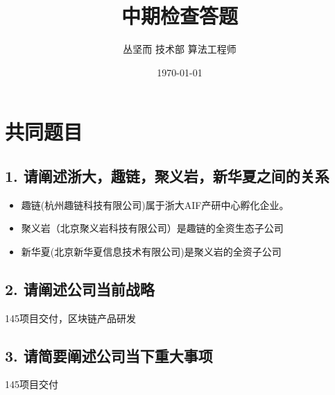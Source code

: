\documentclass[dvipsnames]{ctexart}
\title{中期检查答题}
\date{\today}
\author{丛坚而 技术部 算法工程师}
\begin{document}
\maketitle{}

\section*{共同题目}

\subsection*{1. 请阐述浙大，趣链，聚义岩，新华夏之间的关系}

\begin{itemize}
\item 趣链(杭州趣链科技有限公司)属于浙大AIF产研中心孵化企业。
\item 聚义岩（北京聚义岩科技有限公司）是趣链的全资生态子公司
\item 新华夏(北京新华夏信息技术有限公司)是聚义岩的全资子公司
\end{itemize}

\subsection*{2. 请阐述公司当前战略}
145项目交付，区块链产品研发

\subsection*{3. 请简要阐述公司当下重大事项}
145项目交付
\end{document}
